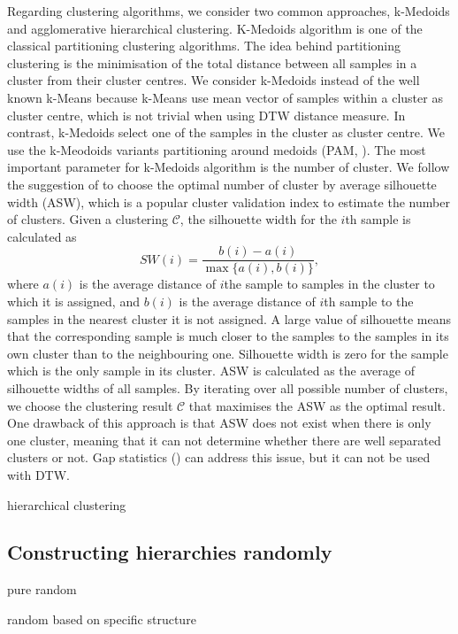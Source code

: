 \documentclass[a4paper,review,12pt,authoryear]{elsarticle}
\begin{document}
Regarding clustering algorithms, we consider two common approaches, k-Medoids and agglomerative hierarchical clustering. K-Medoids algorithm is one of the classical partitioning clustering algorithms. The idea behind partitioning clustering is the minimisation of the total distance between all samples in a cluster from their cluster centres.  We consider k-Medoids instead of the well known k-Means because k-Means use mean vector of samples within a cluster as cluster centre, which is not trivial when using DTW distance measure. In contrast, k-Medoids select one of the samples in the cluster as cluster centre. We use the k-Meodoids variants partitioning around medoids (PAM, \citealp{PartitioningMedoidsProgram1990}). The most important parameter for k-Medoids algorithm is the number of cluster. We follow the suggestion of \cite{PartitioningMedoidsProgram1990} to choose the optimal number of cluster by average silhouette width (ASW), which is a popular cluster validation index to estimate the number of clusters. Given a clustering $\mathcal{C}$, the silhouette width for the $i$th sample is calculated as 
\[
  SW(i) = \frac{b(i)-a(i)}{\max\{a(i), b(i)\}},  
\]
where $a(i)$ is the average distance of $i$the sample to samples in the cluster to which it is assigned, and $b(i)$ is the average distance of $i$th sample to the samples in the nearest cluster it is not assigned. A large value of silhouette means that the corresponding sample is much closer to the samples to the samples in its own cluster than to the neighbouring one. Silhouette width is zero for the sample which is the only sample in its cluster. ASW is calculated as the average of silhouette widths of all samples. By iterating over all possible number of clusters, we choose the clustering result $\mathcal{C}$ that maximises the ASW as the optimal result. One drawback of this approach is that ASW does not exist when there is only one cluster, meaning that it can not determine whether there are well separated clusters or not. Gap statistics (\citealp{tibshiraniEstimatingNumberClusters2002}) can address this issue, but it can not be used with DTW.

hierarchical clustering

\subsection{Constructing hierarchies randomly}

pure random

random based on specific structure
\end{document}
